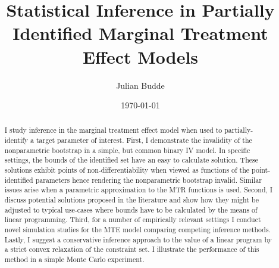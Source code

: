 \documentclass[12pt,a4paper,english]{article} %
\title{Statistical Inference in Partially Identified Marginal Treatment Effect Models}
\author{Julian Budde}
\date{\today}
\numberwithin{equation}{section}
\theoremstyle{definition}
\theoremstyle{remark}
\theoremstyle{plain}
\begin{document}
\maketitle

\begin{abstract}
	I study inference in the marginal treatment effect model when used to partially-identify a target parameter of interest.
	First, I demonstrate the invalidity of the nonparametric bootstrap in a simple, but common binary IV model.
	In specific settings, the bounds of the identified set have an easy to calculate solution.
	These solutions exhibit points of non-differentiability when viewed as functions of the point-identified parameters hence rendering the nonparametric bootstrap invalid.
	Similar issues arise when a parametric approximation to the MTR functions is used.
  Second, I discuss potential solutions proposed in the literature and show how they might be adjusted to typical use-cases where bounds have to be calculated by the means of linear programming.
	Third, for a number of empirically relevant settings I conduct novel simulation studies for the MTE model comparing competing inference methods.
  Lastly, I suggest a conservative inference approach to the value of a linear program by a strict convex relaxation of the constraint set.
  I illustrate the performance of this method in a simple Monte Carlo experiment.
\end{abstract}

\clearpage
\newpage

\tableofcontents

\clearpage
\newpage



\listoffigures

\clearpage
\newpage
\end{document}
